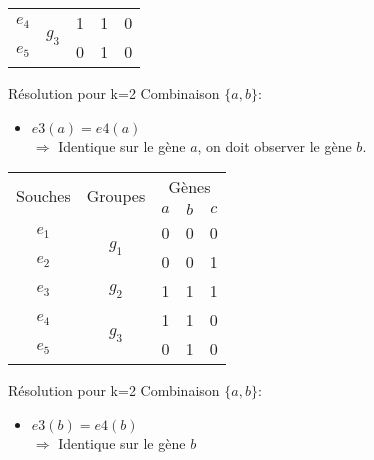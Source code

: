 \begin{overprint}
{\begin{minipage}[l]{0.46\linewidth}
\begin{center}
\begin{tabular}{|c||c|c|c|c|}
						\hline
						$e_4$&\multirow{2}{*}{$g_3$}& \cellcolor{cyan}1 & 1 & 0\\
						\cline{1-1} \cline{3-5}
						$e_5$&& 0 & 1 & 0\\
						\hline
					\end{tabular}
				\end{center}
			\end{minipage}
			\hspace{0.6cm}
			\begin{minipage}[r]{0.46\linewidth}
				\begin{block}{Résolution pour k=2}
					Combinaison $\{a,b\}$:
					\begin{itemize}
						\item $e3(a) = e4(a) $ \\ $\Rightarrow$ Identique sur le gène $a$, on doit observer le gène $b$.
					\end{itemize}
				\end{block}
			\end{minipage}
		}
		{
			\begin{minipage}[l]{0.46\linewidth}
				\begin{center}
					\begin{tabular}{|c||c|c|c|c|}
						\hline
						\multirow{2}{*}{Souches}&\multirow{2}{*}{Groupes}&\multicolumn{3}{c|}{Gènes
						}\\
						&&\cellcolor{blue!75}$a$&\cellcolor{blue!75}$b$&$c$\\
						\hline
						\hline
						$e_1$&\multirow{2}{*}{$g_1$}& 0 & 0 & 0\\
						\cline{1-1} \cline{3-5}
						$e_2$&& 0 & 0 & 1\\
						\hline
						\hline
						$e_3$&$g_2$& 1 & \cellcolor{cyan}1 & 1\\
						\hline
						\hline
						$e_4$&\multirow{2}{*}{$g_3$}& 1 & \cellcolor{cyan}1 & 0\\
						\cline{1-1} \cline{3-5}
						$e_5$&& 0 & 1 & 0\\
						\hline
					\end{tabular}
				\end{center}
			\end{minipage}
			\hspace{0.6cm}
			\begin{minipage}[r]{0.46\linewidth}
				\begin{block}{Résolution pour k=2}
					Combinaison $\{a,b\}$:
					\begin{itemize}
						\item $e3(b) = e4(b) $ \\ $\Rightarrow$ Identique sur le gène $b$

\end{itemize}
\end{block}
\end{minipage}}
\end{overprint}
